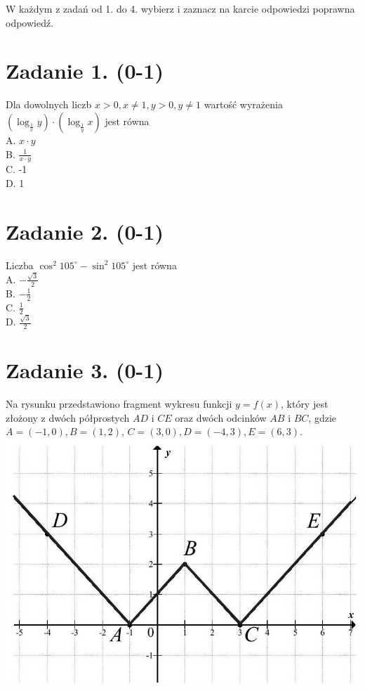 \documentclass[10pt]{article}
\begin{document}
W każdym z zadań od 1. do 4. wybierz i zaznacz na karcie odpowiedzi poprawna odpowiedź.

\section*{Zadanie 1. (0-1)}
Dla dowolnych liczb \(x>0, x \neq 1, y>0, y \neq 1\) wartość wyrażenia \(\left(\log _{\frac{1}{x}} y\right) \cdot\left(\log _{\frac{1}{y}} x\right)\) jest równa\\
A. \(x \cdot y\)\\
B. \(\frac{1}{x \cdot y}\)\\
C. -1\\
D. 1

\section*{Zadanie 2. (0-1)}
Liczba \(\cos ^{2} 105^{\circ}-\sin ^{2} 105^{\circ}\) jest równa\\
A. \(-\frac{\sqrt{3}}{2}\)\\
B. \(-\frac{1}{2}\)\\
C. \(\frac{1}{2}\)\\
D. \(\frac{\sqrt{3}}{2}\)

\section*{Zadanie 3. (0-1)}
Na rysunku przedstawiono fragment wykresu funkcji \(y=f(x)\), który jest złożony z dwóch półprostych \(A D\) i \(C E\) oraz dwóch odcinków \(A B\) i \(B C\), gdzie \(A=(-1,0), B=(1,2)\), \(C=(3,0), D=(-4,3), E=(6,3)\).\\
\includegraphics[max width=\textwidth, center]{2024_11_21_9df891ea1c7ef9791261g-02}
\end{document}
